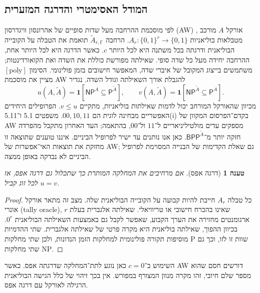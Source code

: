 \documentclass[11pt,a4paper]{article}
\newtheorem{proposition}[theorem]{טענה}
\theoremstyle{definition}
\theoremstyle{remark}
\newcommand{\EN}[1]{\textenglish{#1}}
\newcommand{\bits}{\{0,1\}}
\newcommand{\PP}{\mathsf{P}}
\newcommand{\NP}{\mathsf{NP}}
\newcommand{\BB}{\mathsf{BPP}}
\newcommand{\Atil}{\widetilde A}
\newcommand{\F}{\mathbb F}
\begin{document}
\subsection{המודל האסימטרי והדרגה המזערית}
לפי מוסכמת ההרחבה מעל שדות סופיים של אהרונסון וויגדרסון (\EN{AW}) \cite{aw}, אורקל $A$ מורכב מטבלאות בוליאניות $A_r:\bits^r\to\bits$. הרחבה $\Atil_{r,\F}$ תואמת את הטבלה על הקובייה הבוליאנית ודרגתה בכל משתנה היא לכל היותר $c$. כאשר הדרגה היא לכל היותר אחת, ההרחבה יחידה מעל כל שדה סופי. שאילתה מפורשת כוללת את השדה ואת הקואורדינטות; משתמשים בייצוג המקובל של איברי שדה, המאפשר חישובים בזמן פולינומי. הסימון $[\mathrm{poly}]$ מציין את מוסכמת \EN{AW} להגבלת אורך השאילתה וגודל השדה. נגדיר
\[
u(A,\Atil)=\mathbf1[\NP^A\subseteq\PP^{\Atil}],\qquad
v(A,\Atil)=\mathbf1[\NP^{\Atil}\subseteq\PP^A].
\]
מכיוון שהאורקל המורחב יכול לדמות שאילתות בוליאניות, מתקיים $v\le u$. הפרופילים היחידים האפשריים מבחינה לוגית הם $00,10,11$. משפטים 5.1 ו־5.11(i) בקדם־הפרסום המקוון של \EN{AW} \cite{aw} מספקים עדים מולטיליניאריים ל־$11$ ול־$00$, בהתאמה; העד האחרון מתקבל מהפרדה חזקה יותר מ־$\BB^{\Atil}$. כאן אנו נותנים עד ישיר לפרופיל הביניים. איננו טוענים שתוצאה זו מחזקת את תוצאות האי־אפשרות של \EN{AW}; גם שאלת הקדימות של הבנייה המסוימת לפרופיל הביניים לא נבדקה באופן ממצה.

\begin{proposition}[דרגה אפס]\label{prop:degree0}
אם מרחיבים את המחלקה המותרת כך שתכלול גם דרגה אפס, אז $u=v$ לכל זוג קביל.
\end{proposition}
\begin{proof}
כל טבלה $A_r$ חייבת להיות קבועה על הקובייה הבוליאנית שלה. מצב זה מתאר אורקל אונרי (\EN{tally oracle}), שאינו בהכרח חישובי או טריוויאלי. שאילתה אלגברית בעלת $r$ ארגומנטים מחזירה את הערך הקבוע, שאפשר לקבל גם באמצעות השאילתה הבוליאנית $0^r$. בכיוון ההפוך, שאילתה בוליאנית היא מקרה פרטי של שאילתה אלגברית. שתי ההדמיות מוסיפות תקורה פולינומית למחלקות הזמן הנדונות, ולכן שתי מחלקות \EN{P} שוות זו לזו, וכך גם שתי מחלקות \EN{NP}.
\end{proof}
השימוש ב־$c=0$ כאן נוגע לתת־המחלקה שדרגתה אפס. כאשר \EN{AW} דורשים חסם שהוא מספר שלם חיובי, זהו מקרה מנוון המצורף במפורש. אין בכך זיהוי של כלל הגישה הבוליאנית הרגילה לאורקל עם דרגה אפס.
\end{document}
